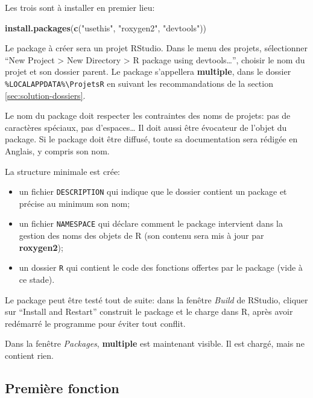 \documentclass[
  12pt,
  french,
  a4paper,
  extrafontsizes,onecolumn,openright
  ]{memoir}
\newenvironment{Shaded}{\begin{snugshade}}{\end{snugshade}}
\newcommand{\KeywordTok}[1]{\textcolor[rgb]{0.13,0.29,0.53}{\textbf{#1}}}
\newcommand{\NormalTok}[1]{#1}
\newcommand{\StringTok}[1]{\textcolor[rgb]{0.31,0.60,0.02}{#1}}
\providecommand{\tightlist}{%
  \setlength{\itemsep}{0pt}\setlength{\parskip}{0pt}}
\begin{document}
Les trois sont à installer en premier lieu:

\scriptsize

\begin{Shaded}
\begin{Highlighting}[]
\KeywordTok{install.packages}\NormalTok{(}\KeywordTok{c}\NormalTok{(}\StringTok{"usethis"}\NormalTok{, }\StringTok{"roxygen2"}\NormalTok{, }\StringTok{"devtools"}\NormalTok{))}
\end{Highlighting}
\end{Shaded}

\normalsize

Le package à créer sera un projet RStudio.
Dans le menu des projets, sélectionner \enquote{New Project \textgreater{} New Directory \textgreater{} R package using devtools\ldots{}}, choisir le nom du projet et son dossier parent.
Le package s'appellera \textbf{multiple}, dans le dossier \texttt{\%LOCALAPPDATA\%\textbackslash{}ProjetsR} en suivant les recommandations de la section \ref{sec:solution-dossiers}.

Le nom du package doit respecter les contraintes des noms de projets: pas de caractères spéciaux, pas d'espaces\ldots{}
Il doit aussi être évocateur de l'objet du package.
Si le package doit être diffusé, toute sa documentation sera rédigée en Anglais, y compris son nom.

La structure minimale est crée:

\begin{itemize}
\tightlist
\item
  un fichier \texttt{DESCRIPTION} qui indique que le dossier contient un package et précise au minimum son nom;
\item
  un fichier \texttt{NAMESPACE} qui déclare comment le package intervient dans la gestion des noms des objets de R (son contenu sera mis à jour par \textbf{roxygen2});
\item
  un dossier \texttt{R} qui contient le code des fonctions offertes par le package (vide à ce stade).
\end{itemize}

Le package peut être testé tout de suite: dans la fenêtre \emph{Build} de RStudio, cliquer sur \enquote{Install and Restart} construit le package et le charge dans R, après avoir redémarré le programme pour éviter tout conflit.

Dans la fenêtre \emph{Packages}, \textbf{multiple} est maintenant visible.
Il est chargé, mais ne contient rien.

\hypertarget{premiuxe8re-fonction}{%
\subsection{Première fonction}\label{premiuxe8re-fonction}}
\end{document}
